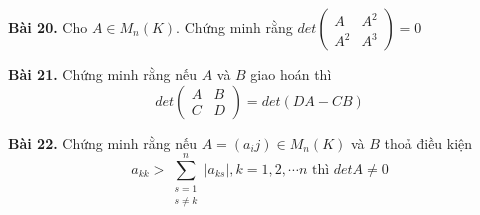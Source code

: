 \documentclass[12pt]{report}
\begin{document}
\textbf{Bài 20.} Cho $A \in M_n(K)$. Chứng minh rằng $det \begin{pmatrix}
	A & A^2 \\ A^2 & A^3 
\end{pmatrix} = 0$

\textbf{Bài 21.} Chứng minh rằng nếu $A$ và $B$ giao hoán thì 
\[ det \begin{pmatrix} A & B \\ C & D \end{pmatrix} = det(DA - CB) \]

\textbf{Bài 22.} Chứng minh rằng nếu $A = (a_ij) \in M_n(K)$ và $B$ thoả điều kiện \[ a_{kk} > \displaystyle \sum_{\substack{s=1 \\ s \neq k}}^n |a_{ks}|, k = 1, 2, \cdots n \text{ thì } detA \neq 0 \]
\end{document}
